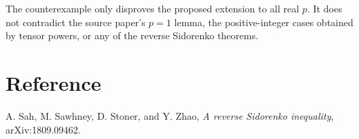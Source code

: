 \documentclass[11pt]{amsart}
\begin{document}
The counterexample only disproves the proposed extension to all real \(p\). It
does not contradict the source paper's \(p=1\) lemma, the positive-integer
cases obtained by tensor powers, or any of the reverse Sidorenko theorems.

\section*{Reference}

A. Sah, M. Sawhney, D. Stoner, and Y. Zhao,
\emph{A reverse Sidorenko inequality}, arXiv:1809.09462.
\end{document}
